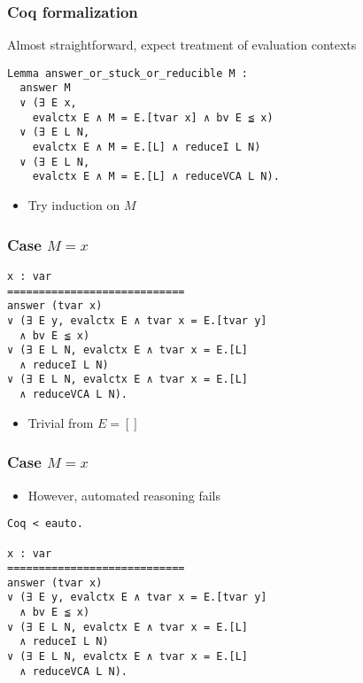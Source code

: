 \documentclass[dvipdfmx,cjk,xcolor=dvipsnames,envcountsect,notheorems,12pt]{beamer}
\theoremstyle{definition}
\begin{document}
\begin{frame}[fragile]
	\frametitle{Coq formalization}
	\Large Almost straightforward, expect treatment of evaluation contexts
\begin{lstlisting}
Lemma answer_or_stuck_or_reducible M :
  answer M
  ∨ (∃ E x,
    evalctx E ∧ M = E.[tvar x] ∧ bv E ≦ x)
  ∨ (∃ E L N,
    evalctx E ∧ M = E.[L] ∧ reduceI L N)
  ∨ (∃ E L N,
    evalctx E ∧ M = E.[L] ∧ reduceVCA L N).
\end{lstlisting}
	\begin{itemize}
		\item Try induction on $M$
	\end{itemize}
\end{frame}

\begin{frame}[fragile]
	\frametitle{Case $M=x$}
\begin{lstlisting}
x : var
============================
answer (tvar x)
∨ (∃ E y, evalctx E ∧ tvar x = E.[tvar y]
  ∧ bv E ≦ x)
∨ (∃ E L N, evalctx E ∧ tvar x = E.[L]
  ∧ reduceI L N)
∨ (∃ E L N, evalctx E ∧ tvar x = E.[L]
  ∧ reduceVCA L N).
\end{lstlisting}
	\begin{itemize}
		\item Trivial from $E = []$
	\end{itemize}
\end{frame}

\begin{frame}[fragile]
	\frametitle{Case $M=x$}
	\begin{itemize}
		\item However, automated reasoning fails
	\end{itemize}
\begin{lstlisting}
Coq < eauto.

x : var
============================
answer (tvar x)
∨ (∃ E y, evalctx E ∧ tvar x = E.[tvar y]
  ∧ bv E ≦ x)
∨ (∃ E L N, evalctx E ∧ tvar x = E.[L]
  ∧ reduceI L N)
∨ (∃ E L N, evalctx E ∧ tvar x = E.[L]
  ∧ reduceVCA L N).
\end{lstlisting}
\end{frame}
\end{document}
